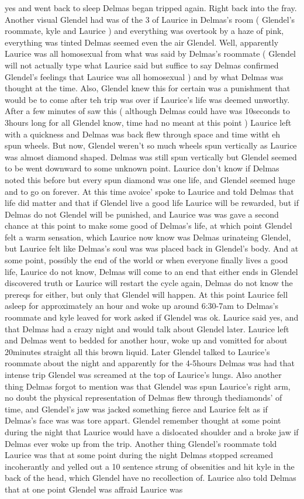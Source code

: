 \documentclass[12pt]{book}
\begin{document}
yes and went back to sleep Delmas began tripped again. Right back into the fray. Another visual Glendel had was of the 3 of Laurice in Delmas's room ( Glendel's roommate, kyle and Laurice ) and everything was overtook by a haze of pink, everything was tinted Delmas seemed even the air Glendel. Well, apparently Laurice was all homosexual from what was said by Delmas's roommate ( Glendel will not actually type what Laurice said but suffice to say Delmas confirmed Glendel's feelings that Laurice was all homosexual ) and by what Delmas was thought at the time. Also, Glendel knew this for certain was a punishment that would be to come after teh trip was over if Laurice's life was deemed unworthy. After a few minutes of saw this ( although Delmas could have was 10seconds to 3hours long for all Glendel know, time had no meant at this point ) Laurice left with a quickness and Delmas was back flew through space and time witht eh spun wheels. But now, Glendel weren't so much wheels spun vertically as Laurice was almost diamond shaped. Delmas was still spun vertically but Glendel seemed to be went downward to some unknown point. Laurice don't know if Delmas noted this before but every spun diamond was one life, and Glendel seemed huge and to go on forever. At this time avoice' spoke to Laurice and told Delmas that life did matter and that if Glendel live a good life Laurice will be rewarded, but if Delmas do not Glendel will be punished, and Laurice was was gave a second chance at this point to make some good of Delmas's life, at which point Glendel felt a warm sensation, which Laurice now know was Delmas urinateing Glendel, but Laurice felt like Delmas's soul was was placed back in Glendel's body. And at some point, possibly the end of the world or when everyone finally lives a good life, Laurice do not know, Delmas will come to an end that either ends in Glendel discovered truth or Laurice will restart the cycle again, Delmas do not know the prereqs for either, but only that Glendel will happen. At this point Laurice fell asleep for approximately an hour and woke up around 6:30-7am to Delmas's roommate and kyle leaved for work asked if Glendel was ok. Laurice said yes, and that Delmas had a crazy night and would talk about Glendel later. Laurice left and Delmas went to bedded for another hour, woke up and vomitted for about 20minutes straight all this brown liquid. Later Glendel talked to Laurice's roommate about the night and apparently for the 4-5hours Delmas was had that intense trip Glendel was screamed at the top of Laurice's lungs. Also another thing Delmas forgot to mention was that Glendel was spun Laurice's right arm, no doubt the physical representation of Delmas flew through thediamonds' of time, and Glendel's jaw was jacked something fierce and Laurice felt as if Delmas's face was was tore appart. Glendel remember thought at some point during the night that Laurice would have a dislocated shoulder and a broke jaw if Delmas ever woke up from the trip. Another thing Glendel's roommate told Laurice was that at some point during the night Delmas stopped screamed incoherantly and yelled out a 10 sentence strung of obsenities and hit kyle in the back of the head, which Glendel have no recollection of. Laurice also told Delmas that at one point Glendel was affraid Laurice was 
\end{document}

